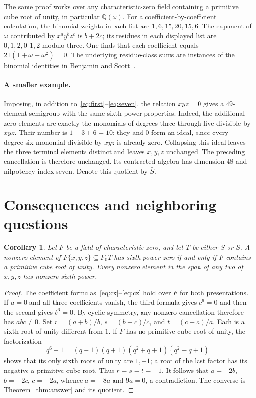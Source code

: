 \documentclass[11pt]{article}
\newtheorem{corollary}[theorem]{Corollary}
\begin{document}
The same proof works over any characteristic-zero field containing a
primitive cube root of unity, in particular $\mathbb Q(\omega)$.
For a coefficient-by-coefficient calculation, the binomial weights in
each list are $1,6,15,20,15,6$. The exponent of $\omega$ contributed by
$x^ay^bz^c$ is $b+2c$; its residues in each displayed list are
$0,1,2,0,1,2$ modulo three. One finds that each coefficient equals
$21(1+\omega+\omega^2)=0$.
The underlying residue-class sums are instances of the binomial identities
in Benjamin and Scott~\cite[Theorem 1.1 and p.\ 100]{BenjaminScott}.

\paragraph{A smaller example.}
Imposing, in addition to~\eqref{eq:first}--\eqref{eq:seven}, the relation $xyz=0$ gives a $49$-element semigroup with the same sixth-power
properties. Indeed, the additional zero elements are exactly the monomials
of degrees three through five divisible by $xyz$. Their number is
$1+3+6=10$; they and $0$ form an ideal, since every degree-six monomial
divisible by $xyz$ is already zero. Collapsing this ideal leaves the
three terminal elements distinct and leaves $x,y,z$ unchanged.
The preceding cancellation is therefore unchanged. Its contracted
algebra has dimension $48$ and nilpotency index seven. Denote this quotient by $\bar S$.

\section{Consequences and neighboring questions}
\begin{corollary}\label{cor:field}
Let $F$ be a field of characteristic zero, and let $T$ be either $S$ or
$\bar S$. A nonzero element of $F\{x,y,z\}\subseteq F_0T$ has sixth power
zero if and only if $F$ contains a primitive cube root of unity.
Every nonzero element in the span of any two of $x,y,z$ has nonzero sixth power.
\end{corollary}
\begin{proof}
The coefficient formulas~\eqref{eq:cx}--\eqref{eq:cz} hold over $F$ for both
presentations. If $a=0$ and all three coefficients vanish, the third formula
gives $c^6=0$ and then the second gives $b^6=0$. By cyclic symmetry,
any nonzero cancellation therefore has $abc\ne0$.
Set $r=(a+b)/b$, $s=(b+c)/c$, and $t=(c+a)/a$. Each is a sixth root of
unity different from $1$. If $F$ has no primitive cube root of unity,
the factorization
\[
q^6-1=(q-1)(q+1)(q^2+q+1)(q^2-q+1)
\]
shows that its only sixth roots of unity are $1,-1$; a root of the last
factor has its negative a primitive cube root. Thus $r=s=t=-1$.
It follows that $a=-2b$, $b=-2c$, $c=-2a$, whence $a=-8a$ and $9a=0$,
a contradiction. The converse is Theorem~\ref{thm:answer} and its quotient.
\end{proof}
\end{document}
